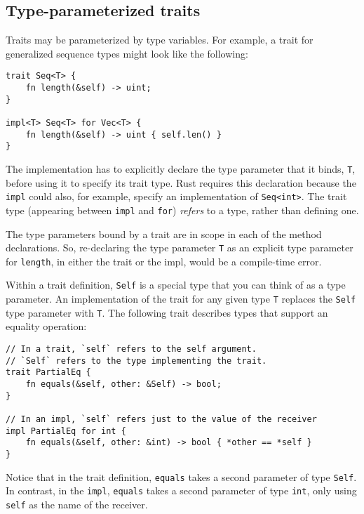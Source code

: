 \documentclass[]{article}
\begin{document}
\subsection{Type-parameterized traits}\label{type-parameterized-traits}

Traits may be parameterized by type variables. For example, a trait for
generalized sequence types might look like the following:

\begin{verbatim}
trait Seq<T> {
    fn length(&self) -> uint;
}

impl<T> Seq<T> for Vec<T> {
    fn length(&self) -> uint { self.len() }
}
\end{verbatim}

The implementation has to explicitly declare the type parameter that it
binds, \texttt{T}, before using it to specify its trait type. Rust
requires this declaration because the \texttt{impl} could also, for
example, specify an implementation of
\texttt{Seq\textless{}int\textgreater{}}. The trait type (appearing
between \texttt{impl} and \texttt{for}) \emph{refers} to a type, rather
than defining one.

The type parameters bound by a trait are in scope in each of the method
declarations. So, re-declaring the type parameter \texttt{T} as an
explicit type parameter for \texttt{length}, in either the trait or the
impl, would be a compile-time error.

Within a trait definition, \texttt{Self} is a special type that you can
think of as a type parameter. An implementation of the trait for any
given type \texttt{T} replaces the \texttt{Self} type parameter with
\texttt{T}. The following trait describes types that support an equality
operation:

\begin{verbatim}
// In a trait, `self` refers to the self argument.
// `Self` refers to the type implementing the trait.
trait PartialEq {
    fn equals(&self, other: &Self) -> bool;
}

// In an impl, `self` refers just to the value of the receiver
impl PartialEq for int {
    fn equals(&self, other: &int) -> bool { *other == *self }
}
\end{verbatim}

Notice that in the trait definition, \texttt{equals} takes a second
parameter of type \texttt{Self}. In contrast, in the \texttt{impl},
\texttt{equals} takes a second parameter of type \texttt{int}, only
using \texttt{self} as the name of the receiver.
\end{document}
